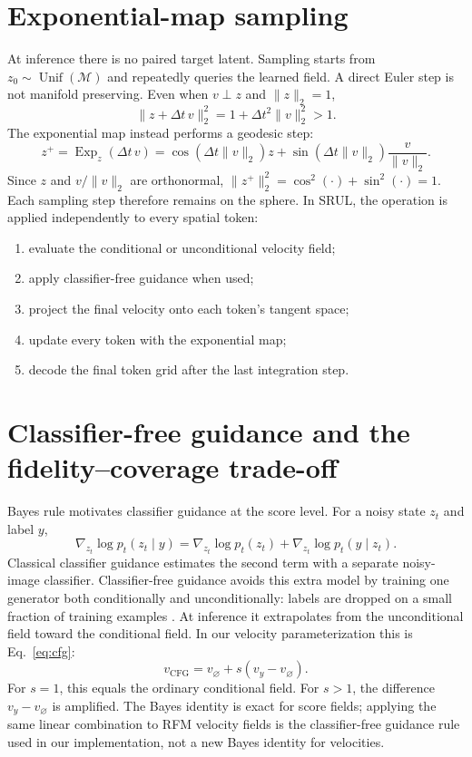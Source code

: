 \documentclass{article}
\begin{document}
\section{Exponential-map sampling}
\label{app:exp}
At inference there is no paired target latent. Sampling starts from $z_0\sim\operatorname{Unif}(\mathcal M)$ and repeatedly queries the learned field. A direct Euler step is not manifold preserving. Even when $v\perp z$ and $\|z\|_2=1$,
\begin{equation}
 \|z+\Delta t\,v\|_2^2=1+\Delta t^2\|v\|_2^2>1.
\end{equation}
The exponential map instead performs a geodesic step:
\begin{equation}
 z^+=\operatorname{Exp}_z(\Delta t\,v)
 =\cos(\Delta t\|v\|_2)z
 +\sin(\Delta t\|v\|_2)\frac{v}{\|v\|_2}.
\end{equation}
Since $z$ and $v/\|v\|_2$ are orthonormal, $\|z^+\|_2^2=\cos^2(\cdot)+\sin^2(\cdot)=1$. Each sampling step therefore remains on the sphere. In SRUL, the operation is applied independently to every spatial token:
\begin{enumerate}
 \item evaluate the conditional or unconditional velocity field;
 \item apply classifier-free guidance when used;
 \item project the final velocity onto each token's tangent space;
 \item update every token with the exponential map;
 \item decode the final token grid after the last integration step.
\end{enumerate}

\section{Classifier-free guidance and the fidelity--coverage trade-off}
\label{app:cfg}
Bayes rule motivates classifier guidance at the score level. For a noisy state $z_t$ and label $y$,
\begin{equation}
 \nabla_{z_t}\log p_t(z_t\mid y)
 =\nabla_{z_t}\log p_t(z_t)+\nabla_{z_t}\log p_t(y\mid z_t).
\end{equation}
Classical classifier guidance estimates the second term with a separate noisy-image classifier. Classifier-free guidance avoids this extra model by training one generator both conditionally and unconditionally: labels are dropped on a small fraction of training examples \cite{cfg}. At inference it extrapolates from the unconditional field toward the conditional field. In our velocity parameterization this is Eq.~\eqref{eq:cfg}:
\begin{equation}
 v_{\mathrm{CFG}}=v_{\varnothing}+s(v_y-v_{\varnothing}).
\end{equation}
For $s=1$, this equals the ordinary conditional field. For $s>1$, the difference $v_y-v_{\varnothing}$ is amplified. The Bayes identity is exact for score fields; applying the same linear combination to RFM velocity fields is the classifier-free guidance rule used in our implementation, not a new Bayes identity for velocities.
\end{document}
